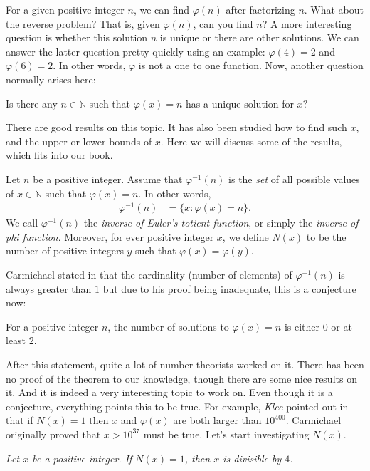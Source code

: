 \documentclass{subfile}
\begin{document}
	For a given positive integer $n$, we can find $\varphi(n)$ after factorizing $n$. What about the reverse problem? That is, given $\varphi(n)$, can you find $n$? A more interesting question is whether this solution $n$ is unique or there are other solutions. We can answer the latter question pretty quickly using an example: $\varphi(4)=2$ and $\varphi (6)=2$. In other words, $\varphi $ is not a one to one function. Now, another question normally arises here:
		\begin{problem}
			Is there any $n\in\mathbb{N}$ such that $\varphi(x)=n$ has a unique solution for $x$?
		\end{problem}
	There are good results on this topic. It has also been studied how to find such $x$, and the upper or lower bounds of $x$. Here we will discuss some of the results, which fits into our book.
		\begin{definition}
			Let $n$ be a positive integer. Assume that $\varphi ^{-1}(n)$ is the \textit{set} of all possible values of $x\in\mathbb{N} $ such that $\varphi (x)=n$. In other words,
				\begin{align*}
					\varphi^{-1}(n) & = \{x:\varphi(x)=n\}.
				\end{align*}
			We call $\varphi^{-1}(n)$ the \textit{inverse of Euler's totient function}, or simply the \textit{inverse of phi function}. Moreover, for ever positive integer $x$, we define $N(x)$ to be the number of positive integers $y$ such that $\varphi(x)=\varphi(y)$.
		\end{definition}
	
	Carmichael stated in \cite{carmichael} that the cardinality (number of elements) of $\varphi^{-1}(n)$ is always greater than $1$ but due to his proof being inadequate, this is a conjecture now:
		\begin{conjecture}
			For a positive integer $n$, the number of solutions to $\varphi(x)=n$ is either $0$ or at least $2$.
		\end{conjecture}
	After this statement, quite a lot of number theorists worked on it. There has been no proof of the theorem to our knowledge, though there are some nice results on it. And it is indeed a very interesting topic to work on. Even though it is a conjecture, everything points this to be true. For example, \textit{Klee} pointed out in \cite{klee} that if $N(x)=1$ then $x$ and $\varphi(x)$ are both larger than $10^{400}$. Carmichael originally proved that $x>10^{37}$ must be true. Let's start investigating $N(x)$.
		\begin{theorem}\slshape
			Let $x$ be a positive integer. If $N(x)=1$, then $x$ is divisible by $4$.
		\end{theorem}
		
\end{document}
